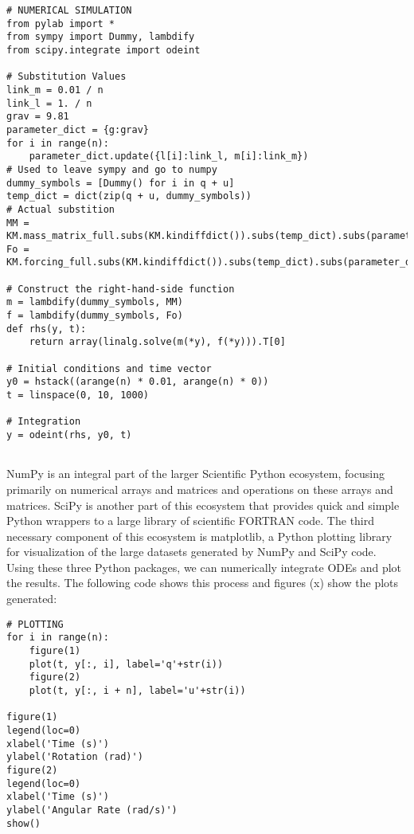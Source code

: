 \documentclass[twocolumn,10pt]{asme2e}
\begin{document}
\begin{figure*}
\begin{Verbatim}[frame=single]
# NUMERICAL SIMULATION
from pylab import *
from sympy import Dummy, lambdify
from scipy.integrate import odeint

# Substitution Values
link_m = 0.01 / n
link_l = 1. / n
grav = 9.81
parameter_dict = {g:grav}
for i in range(n):
    parameter_dict.update({l[i]:link_l, m[i]:link_m})
# Used to leave sympy and go to numpy
dummy_symbols = [Dummy() for i in q + u]
temp_dict = dict(zip(q + u, dummy_symbols))
# Actual substition
MM = KM.mass_matrix_full.subs(KM.kindiffdict()).subs(temp_dict).subs(parameter_dict)
Fo = KM.forcing_full.subs(KM.kindiffdict()).subs(temp_dict).subs(parameter_dict)

# Construct the right-hand-side function
m = lambdify(dummy_symbols, MM)
f = lambdify(dummy_symbols, Fo)
def rhs(y, t):
    return array(linalg.solve(m(*y), f(*y))).T[0]

# Initial conditions and time vector
y0 = hstack((arange(n) * 0.01, arange(n) * 0))
t = linspace(0, 10, 1000)

# Integration
y = odeint(rhs, y0, t)


\end{Verbatim}
\end{figure*}

NumPy is an integral part of the larger Scientific Python ecosystem, focusing
primarily on numerical arrays and matrices and operations on these arrays and
matrices.
SciPy is another part of this ecosystem that provides quick and simple Python
wrappers to a large library of scientific FORTRAN code.
The third necessary component of this ecosystem is matplotlib, a Python
plotting library for visualization of the large datasets generated by NumPy and
SciPy code.
Using these three Python packages, we can numerically integrate ODEs and plot
the results.
The following code shows this process and figures (x) show the plots generated:

\begin{figure*}
\begin{Verbatim}[frame=single]
# PLOTTING
for i in range(n):
    figure(1)
    plot(t, y[:, i], label='q'+str(i))
    figure(2)
    plot(t, y[:, i + n], label='u'+str(i))

figure(1)
legend(loc=0)
xlabel('Time (s)')
ylabel('Rotation (rad)')
figure(2)
legend(loc=0)
xlabel('Time (s)')
ylabel('Angular Rate (rad/s)')
show()
\end{Verbatim}
\end{figure*}
\end{document}
